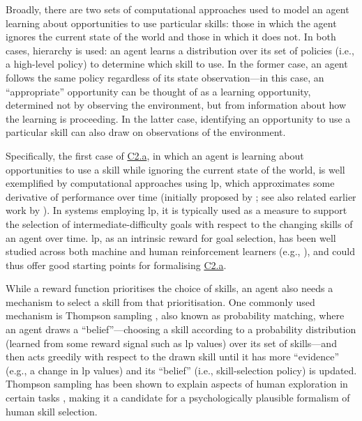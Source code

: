 \documentclass[10pt,letterpaper]{article}
\begin{document}
Broadly, there are two sets of computational approaches used to model an agent learning about opportunities to use particular skills: those in which the agent ignores the current state of the world and those in which it does not. In both cases, hierarchy is used: an agent learns a distribution over its set of policies (i.e., a high-level policy) to determine which skill to use. In the former case, an agent follows the same policy regardless of its state observation---in this case, an ``appropriate'' opportunity can be thought of as a learning opportunity, determined not by observing the environment, but from information about how the learning is proceeding. In the latter case, identifying an opportunity to use a particular skill can also draw on observations of the environment.

Specifically, the first case of \hyperref[sec:c2a]{C2.a}, in which an agent is learning about opportunities to use a skill while ignoring the current state of the world, is well exemplified by computational approaches using \gls{lp}, which approximates some derivative of performance over time (initially proposed by \citealp[p.~7]{oudeyer2007intrinsic}; see also related earlier work by \citealp[p.~1461]{schmidhuber1991curious}). In systems employing \gls{lp}, it is typically used as a measure to support the selection of intermediate-difficulty goals with respect to the changing skills of an agent over time.
\Gls{lp}, as an intrinsic reward for goal selection, has been well studied across both machine and human reinforcement learners (e.g., \citealp{colas2019curious,ten2021humans,molinaro2024latent}), and could thus offer good starting points for formalising \hyperref[sec:c2a]{C2.a}.

While a reward function prioritises the choice of skills, an agent also needs a mechanism to select a skill from that prioritisation. One commonly used mechanism is Thompson sampling \citep{thompson1933on}, also known as probability matching, where an agent draws a ``belief''---choosing a skill according to a probability distribution (learned from some reward signal such as \gls{lp} values) over its set of skills---and then acts greedily with respect to the drawn skill until it has more ``evidence'' (e.g., a change in \gls{lp} values) and its ``belief'' (i.e., skill-selection policy) is updated. Thompson sampling has been shown to explain aspects of human exploration in certain tasks \citep{gershman2018deconstructing}, making it a candidate for a psychologically plausible formalism of human skill selection.
\end{document}
